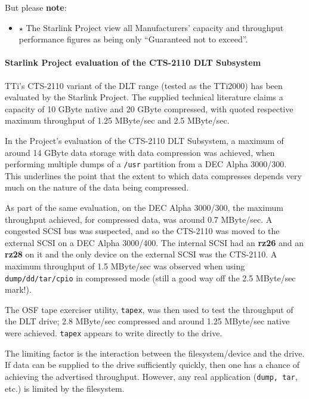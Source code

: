 \documentclass[11pt]{article}
\begin{document}
But please {\bf note}:
\begin {itemize}

\item[{\LARGE\bf $\star$}] The Starlink Project view all Manufacturers' capacity
and throughput performance figures as being only ``Guaranteed not to exceed''.

\end {itemize}

\paragraph {Starlink Project evaluation of the CTS-2110 DLT Subsystem}

TTi's CTS-2110 variant of the DLT range (tested as the TTi2000) has been
evaluated by the Starlink Project. The supplied technical literature claims
a capacity of 10 GByte native and 20 GByte compressed, with quoted
respective maximum throughput of 1.25 MByte/sec and 2.5 MByte/sec.

In the Project's evaluation of the CTS-2110 DLT Subsystem, a maximum of
around 14 GByte data storage with data compression was achieved, when
performing multiple dumps of a {\tt /usr} partition from a DEC Alpha
3000/300. This underlines the point that the extent to which data compresses
depends very much on the nature of the data being compressed.

As part of the same evaluation, on the DEC Alpha 3000/300, the maximum
throughput achieved, for compressed data, was around 0.7 MByte/sec. A
congested SCSI bus was suspected, and so the CTS-2110 was moved to the
external SCSI on a DEC Alpha 3000/400. The internal SCSI had an {\bf rz26}
and an {\bf rz28} on it and the only device on the external SCSI was the
CTS-2110. A maximum throughput of 1.5 MByte/sec was observed when using
{\tt dump/dd/tar/cpio} in compressed mode (still a good way off the 2.5
MByte/sec mark!).

The OSF tape exerciser utility, {\tt tapex}, was then used to test the
throughput of the DLT drive; 2.8 MByte/sec compressed and around 1.25
MByte/sec native were achieved. {\tt tapex} appears to write directly to the
drive.

The limiting factor is the interaction between the filesystem/device and
the drive. If data can be supplied to the drive sufficiently quickly, then
one has a chance of achieving the advertised throughput. However, any real
application ({\tt dump, tar}, etc.) is limited by the filesystem.
\end{document}
